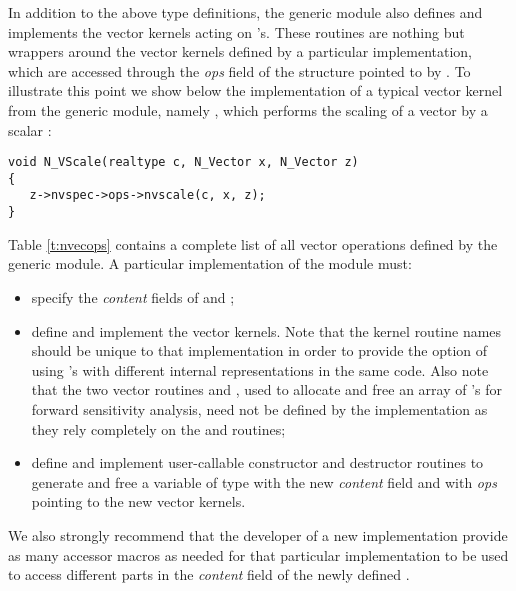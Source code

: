 In addition to the above type definitions, the generic {\nvector} module
also defines and implements the vector kernels acting on 's.
These routines are nothing but wrappers around the vector kernels defined by
a particular {\nvector} implementation, which are accessed through the {\em ops}
field of the structure pointed to by . To illustrate this point we
show below the implementation of a typical vector kernel from the
generic {\nvector} module, namely , which performs the scaling of a
vector  by a scalar :
\begin{verbatim}
void N_VScale(realtype c, N_Vector x, N_Vector z) 
{
   z->nvspec->ops->nvscale(c, x, z);
}
\end{verbatim}
Table \ref{t:nvecops} contains a complete list of all vector operations defined
by the generic {\nvector} module.
A particular implementation of the {\nvector} module must:
\begin{itemize}
\item specify the {\em content} fields of  and ;
\item define and implement the vector kernels. Note that the kernel routine 
  names should be unique to that implementation in order 
  to provide the option of using 's with different 
  internal representations in the same code. Also note that the two
  vector routines  and , used to allocate and
  free an array of 's for forward sensitivity analysis, need not
  be defined by the {\nvector} implementation as they rely completely
  on the  and  routines;
\item define and implement user-callable constructor and destructor
  routines to generate and free a variable of type  with
  the new {\em content} field and with {\em ops} pointing to the
  new vector kernels.
\end{itemize}
We also strongly recommend that the developer of a new 
{\nvector} implementation provide as many accessor macros 
as needed for that particular implementation to 
be used to access different parts in the {\em content} field
of the newly defined .



\newpage
\bigskip
\newlength{\colone}
\newlength{\coltwo}
\setlength{\coltwo}{\textwidth}
\addtolength{\coltwo}{-0.5in}
\addtolength{\coltwo}{-\colone}

